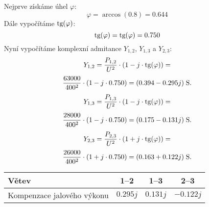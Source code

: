Nejprve získáme úhel $\varphi$:$$ \varphi = \arccos(0.8) = 0.644$$Dále vypočítáme $\textrm{tg} (\varphi)$:$$\textrm{tg} (\varphi) = \textrm{tg} (\varphi) = 0.750$$Nyní vypočítáme komplexní admitance $Y_{1,2}$, $Y_{1,3}$ a $Y_{2,3}$:$$Y_{1,2} = \frac{P_{1,2}}{U^2} \cdot \left(1 - j \cdot \textrm{tg} (\varphi) \right) =$$$$\frac{ 63000 }{ 400^2 } \cdot \left(1 - j \cdot 0.750 \right) = (0.394 - 0.295j) \; \textrm{S}.$$$$Y_{1,3} = \frac{P_{1,3}}{U^2} \cdot \left(1 - j \cdot \textrm{tg} (\varphi) \right) =$$$$\frac{ 28000 }{ 400^2 } \cdot \left(1 - j \cdot 0.750 \right) = (0.175 - 0.131j) \; \textrm{S}.$$$$Y_{2,3} = \frac{P_{2,3}}{U^2} \cdot \left(1 + j \cdot \textrm{tg} (\varphi) \right) =$$$$\frac{ 26000 }{ 400^2 } \cdot \left(1 + j \cdot 0.750 \right) = (0.163 + 0.122j) \; \textrm{S}.$$
    \begin{table}[H]
    \centering
    \begin{tabular}{l c c c}
    \hline
Větev & 1--2 & 1--3 & 2--3\\
\hline
Kompenzace jalového výkonu & $0.295j$ & $0.131j$ & $-0.122j$\\
\hline

    \end{tabular}
    \end{table}
    